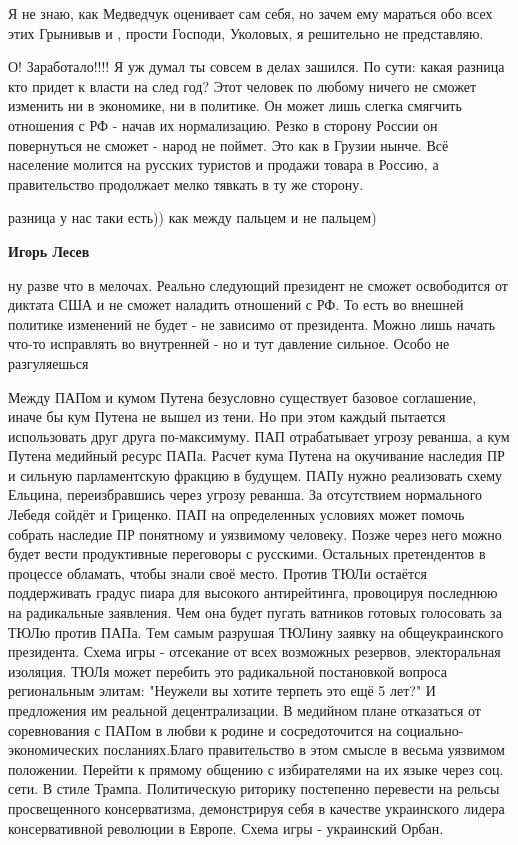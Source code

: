\begin{itemize}

Я не знаю, как Медведчук оценивает сам себя, но зачем ему мараться обо всех
этих Грынивыв и , прости Господи, Уколовых, я решительно не представляю.


О! Заработало!!!! Я уж думал ты совсем в делах зашился. По сути: какая разница
кто придет к власти на след год? Этот человек по любому ничего не сможет
изменить ни в экономике, ни в политике. Он может лишь слегка смягчить отношения
с РФ - начав их нормализацию. Резко в сторону России он повернуться не сможет -
народ не поймет. Это как в Грузии нынче. Всё население молится на русских
туристов и продажи товара в Россию, а правительство продолжает мелко тявкать в
ту же сторону.

\begin{itemize} %
разница у нас таки есть)) как между пальцем и не пальцем)

\textbf{Игорь Лесев} 

ну разве что в мелочах. Реально следующий президент не сможет освободится от
диктата США и не сможет наладить отношений с РФ. То есть во внешней политике
изменений не будет - не зависимо от президента. Можно лишь начать что-то
исправлять во внутренней - но и тут давление сильное. Особо не разгуляешься

\end{itemize} %


Между ПАПом и кумом Путена безусловно существует базовое соглашение, иначе бы
кум Путена не вышел из тени. Но при этом каждый пытается использовать друг
друга по-максимуму. ПАП отрабатывает угрозу реванша, а кум Путена медийный
ресурс ПАПа. Расчет кума Путена на окучивание наследия ПР и сильную
парламентскую фракцию в будущем. ПАПу нужно реализовать схему Ельцина,
переизбравшись через угрозу реванша. За отсутствием нормального Лебедя сойдёт и
Гриценко. ПАП на определенных условиях может помочь собрать наследие ПР
понятному и уязвимому человеку. Позже через него можно будет вести продуктивные
переговоры с русскими. Остальных претендентов в процессе обламать, чтобы знали
своё место. Против ТЮЛи остаётся поддерживать градус пиара для высокого
антирейтинга, провоцируя последнюю на радикальные заявления. Чем она будет
пугать ватников готовых голосовать за ТЮЛю против ПАПа. Тем самым разрушая
ТЮЛину заявку на общеукраинского президента. Схема игры - отсекание от всех
возможных резервов, электоральная изоляция. ТЮЛя может перебить это радикальной
постановкой вопроса региональным элитам: "Неужели вы хотите терпеть это ещё 5
лет?" И предложения им реальной децентрализации. В медийном плане отказаться от
соревнования с ПАПом в любви к родине и сосредоточится на
социально-экономических посланиях.Благо правительство в этом смысле в весьма
уязвимом положении. Перейти к прямому общению с избирателями на их языке через
соц. сети. В стиле Трампа. Политическую риторику постепенно перевести на рельсы
просвещенного консерватизма, демонстрируя себя в качестве украинского лидера
консервативной революции в Европе. Схема игры - украинский Орбан.


\end{itemize}
